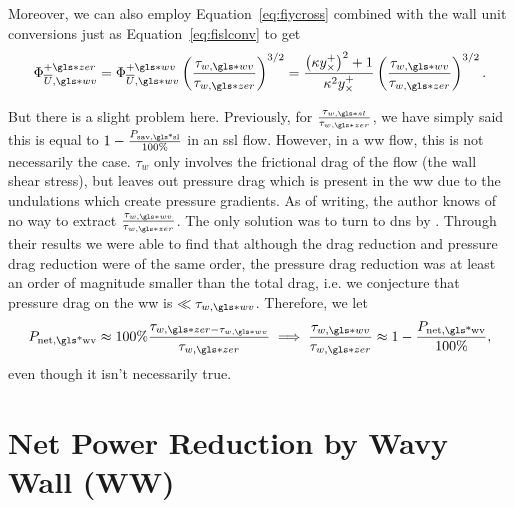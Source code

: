 Moreover, we can also employ Equation~\eqref{eq:fiycross} combined with the wall unit conversions just as Equation~\eqref{eq:fislconv} to get
\begin{equation}
	\Phi _{\overline{U},\gls*{wv}}\pz = \Phi _{\overline{U},\gls*{wv}}\pw \left( \frac{\tau_{w,\gls*{wv}}}{\tau_{w,\gls*{zer}}} \right) ^{3 /2 }=\frac{\left(  \kappa y_{\times}^{+}  \right) ^2+ 1}{\kappa^2 y_{\times}^{+}} \left(  \frac{\tau_{w,\gls*{wv}}}{\tau_{w,\gls*{zer}}} \right) ^{3 /2 } \label{eq:fiwwpzycr}
.\end{equation}

But there is a slight problem here. Previously, for $\frac{\tau_{w,\gls*{sl}}}{\tau_{w,\gls*{zer}}}$, we have simply said this is equal to $1-\frac{P_\text{sav,\gls*{sl}}}{100\%} $ in an \gls*{ssl} flow. However, in a \gls*{ww} flow, this is not necessarily the case. $\tau_w$ only involves the frictional drag of the flow (the wall shear stress), but leaves out pressure drag which is present in the  \gls*{ww} due to the undulations which create pressure gradients. As of writing, the author knows of no way to extract $\frac{\tau_{w,\gls*{wv}}}{\tau_{w,\gls*{zer}}}$. The only solution was to turn to \gls*{dns} by \sgt. Through their results we were able to find that although the drag reduction and pressure drag reduction were of the same order, the pressure drag reduction was at least an order of magnitude smaller than the total drag, i.e. we conjecture that pressure drag on the \gls*{ww} is $\ll \tau_{w,\gls*{wv}}$. Therefore, we let
\begin{equation}
	P_\text{net,\gls*{wv}}\approx 100\% \frac{\tau_{w,\gls*{zer}-\tau_{w,\gls*{wv}}}}{\tau_{w,\gls*{zer}}} \implies  \frac{\tau_{w,\gls*{wv}}}{\tau_{w,\gls*{zer}}}\approx1-\frac{P_\text{net,\gls*{wv}} }{100\%}\label{eq:tauassump}
,\end{equation}
even though it isn't necessarily true.

\section{Net Power Reduction by Wavy Wall (WW)}
